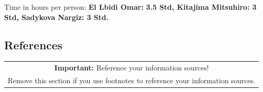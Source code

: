 \documentclass[11pt]{scrartcl}
\begin{document}
Time in hours per person: \textbf{El Lbidi Omar: 3.5 Std, Kitajima Mitsuhiro: 3 Std, Sadykova Nargiz: 3 Std.}

\subsection*{References}

\begin{table}[H]
  \centering
  \begin{tabular}{c}
    \hline
    \textbf{Important:} Reference your information sources! \tabularnewline
    Remove this section if you use footnotes to reference your information
    sources. \tabularnewline
    \hline
  \end{tabular}
\end{table}
\end{document}
